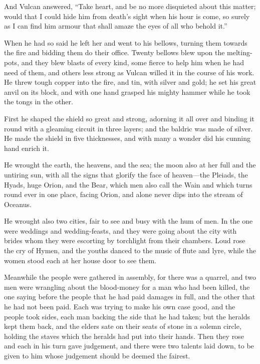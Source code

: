 And Vulcan answered, “Take heart, and be no more disquieted about this
matter; would that I could hide him from death’s sight when his hour is
come, so surely as I can find him armour that shall amaze the eyes of all
who behold it.”

When he had so said he left her and went to his bellows, turning them
towards the fire and bidding them do their office. Twenty bellows blew
upon the melting-pots, and they blew blasts of every kind, some fierce to
help him when he had need of them, and others less strong as Vulcan willed
it in the course of his work. He threw tough copper into the fire, and
tin, with silver and gold; he set his great anvil on its block, and with
one hand grasped his mighty hammer while he took the tongs in the other.

First he shaped the shield so great and strong, adorning it all over and
binding it round with a gleaming circuit in three layers; and the baldric
was made of silver. He made the shield in five thicknesses, and with many
a wonder did his cunning hand enrich it.

He wrought the earth, the heavens, and the sea; the moon also at her full
and the untiring sun, with all the signs that glorify the face of heaven—the
Pleiads, the Hyads, huge Orion, and the Bear, which men also call the Wain
and which turns round ever in one place, facing Orion, and alone never
dips into the stream of Oceanus.

He wrought also two cities, fair to see and busy with the hum of men. In
the one were weddings and wedding-feasts, and they were going about the
city with brides whom they were escorting by torchlight from their
chambers. Loud rose the cry of Hymen, and the youths danced to the music
of flute and lyre, while the women stood each at her house door to see
them.

Meanwhile the people were gathered in assembly, for there was a quarrel,
and two men were wrangling about the blood-money for a man who had been
killed, the one saying before the people that he had paid damages in full,
and the other that he had not been paid. Each was trying to make his own
case good, and the people took sides, each man backing the side that he
had taken; but the heralds kept them back, and the elders sate on their
seats of stone in a solemn circle, holding the staves which the heralds
had put into their hands. Then they rose and each in his turn gave
judgement, and there were two talents laid down, to be given to him whose
judgement should be deemed the fairest.

